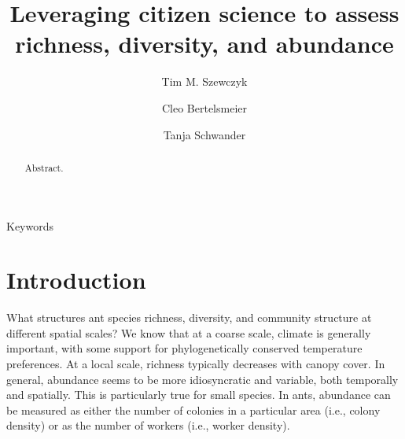 \documentclass[preprint,review,times,12pt]{elsarticle}
\begin{document}
\begin{frontmatter}

\title{Leveraging citizen science to assess richness, diversity, and abundance}

\author[DEE]{Tim M. Szewczyk}
\author[DEE]{Cleo Bertelsmeier}
\author[DEE]{Tanja Schwander}

\address[DEE]{Department of Ecology and Evolution, University of Lausanne}


\begin{abstract}
Abstract.
\end{abstract}

\begin{keyword}
Keywords
\end{keyword}

\end{frontmatter}
\linenumbers



\section{Introduction}
\label{S:1}
What structures ant species richness, diversity, and community structure at different spatial scales? We know that at a coarse scale, climate is generally important, with some support for phylogenetically conserved temperature preferences. At a local scale, richness typically decreases with canopy cover. In general, abundance seems to be more idiosyncratic and variable, both temporally and spatially. This is particularly true for small species. In ants, abundance can be measured as either the number of colonies in a particular area (i.e., colony density) or as the number of workers (i.e., worker density). 
\end{document}
